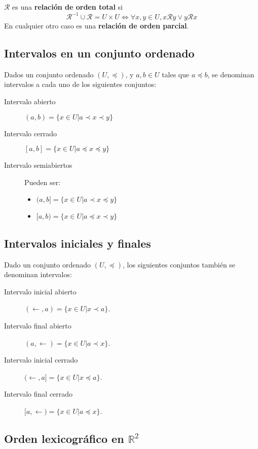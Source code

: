 $\mathcal{R}$ es una \textbf{relación de orden total} si
\[
\mathcal{R}^{-1} \cup \mathcal{R} = U \times U \Leftrightarrow \forall x,y \in U, x\mathcal{R}y \vee y\mathcal{R}x
\]
En cualquier otro caso es una \textbf{relación de orden parcial}.

\subsection{Intervalos en un conjunto ordenado}

Dados un conjunto ordenado $(U,\preceq)$, y $a,b \in U$ tales que $a \preccurlyeq b$, se denominan intervalos a cada uno de los siguientes conjuntos:
\begin{description}
\item[Intervalo abierto] $(a,b) = \{x \in U| a \prec x \prec y\}$
\item[Intervalo cerrado] $[a,b] = \{x \in U| a \preceq x \preceq y\}$
\item[Intervalo semiabiertos] Pueden ser:
\begin{itemize}
\item $(a,b] = \{x \in U| a \prec x \preceq y\}$
\item $[a,b) = \{x \in U| a \preceq x \prec y\}$
\end{itemize}
\end{description}

\subsection{Intervalos iniciales y finales}

Dado un conjunto ordenado $(U,\preceq)$, los siguientes conjuntos también se denominan intervalos:
\begin{description}
\item[Intervalo inicial abierto] $(\leftarrow,a) = \{x \in U| x \prec a\}$.
\item[Intervalo final abierto] $(a,\leftarrow) = \{x \in U| a \prec x\}$.
\item[Intervalo inicial cerrado] $(\leftarrow,a] = \{x \in U| x \preceq a\}$.
\item[Intervalo final cerrado] $[a,\leftarrow) = \{x \in U| a \preceq x\}$.
\end{description}

\subsection{Orden lexicográfico en $\mathbb{R}^2$}

